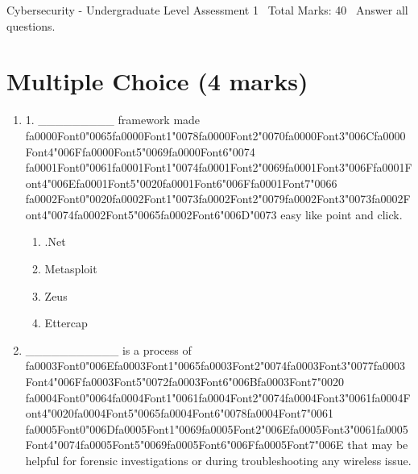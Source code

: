 \documentclass[12pt]{article}
\begin{document}
\begin{center}
Cybersecurity - Undergraduate Level Assessment 1 \
Total Marks: 40 \
Answer all questions.
\end{center}

\section*{Multiple Choice (4 marks)}
\begin{enumerate}[label=\arabic*.]
\item 1. \_\_\_\_\_\_\_\_\_ framework made {\csname fa0000Font0\endcsname\char"0065}{\csname fa0000Font1\endcsname\char"0078}{\csname fa0000Font2\endcsname\char"0070}{\csname fa0000Font3\endcsname\char"006C}{\csname fa0000Font4\endcsname\char"006F}{\csname fa0000Font5\endcsname\char"0069}{\csname fa0000Font6\endcsname\char"0074} {\csname fa0001Font0\endcsname\char"0061}{\csname fa0001Font1\endcsname\char"0074}{\csname fa0001Font2\endcsname\char"0069}{\csname fa0001Font3\endcsname\char"006F}{\csname fa0001Font4\endcsname\char"006E}{\csname fa0001Font5\endcsname\char"0020}{\csname fa0001Font6\endcsname\char"006F}{\csname fa0001Font7\endcsname\char"0066} {\csname fa0002Font0\endcsname\char"0020}{\csname fa0002Font1\endcsname\char"0073}{\csname fa0002Font2\endcsname\char"0079}{\csname fa0002Font3\endcsname\char"0073}{\csname fa0002Font4\endcsname\char"0074}{\csname fa0002Font5\endcsname\char"0065}{\csname fa0002Font6\endcsname\char"006D}{\char"0073} easy like point and click.
\begin{enumerate}[label=(\alph*)]
    \item .Net
    \item Metasploit
    \item Zeus
    \item Ettercap
\end{enumerate}
\item \_\_\_\_\_\_\_\_\_\_\_ is a process of {\csname fa0003Font0\endcsname\char"006E}{\csname fa0003Font1\endcsname\char"0065}{\csname fa0003Font2\endcsname\char"0074}{\csname fa0003Font3\endcsname\char"0077}{\csname fa0003Font4\endcsname\char"006F}{\csname fa0003Font5\endcsname\char"0072}{\csname fa0003Font6\endcsname\char"006B}{\csname fa0003Font7\endcsname\char"0020} {\csname fa0004Font0\endcsname\char"0064}{\csname fa0004Font1\endcsname\char"0061}{\csname fa0004Font2\endcsname\char"0074}{\csname fa0004Font3\endcsname\char"0061}{\csname fa0004Font4\endcsname\char"0020}{\csname fa0004Font5\endcsname\char"0065}{\csname fa0004Font6\endcsname\char"0078}{\csname fa0004Font7\endcsname\char"0061} {\csname fa0005Font0\endcsname\char"006D}{\csname fa0005Font1\endcsname\char"0069}{\csname fa0005Font2\endcsname\char"006E}{\csname fa0005Font3\endcsname\char"0061}{\csname fa0005Font4\endcsname\char"0074}{\csname fa0005Font5\endcsname\char"0069}{\csname fa0005Font6\endcsname\char"006F}{\csname fa0005Font7\endcsname\char"006E} that may be helpful for forensic investigations or during troubleshooting any wireless issue.

\end{enumerate}
\end{document}
